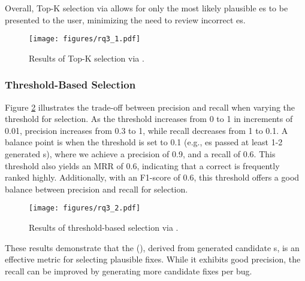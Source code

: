 Overall, Top-K selection via \enpassrate allows for only the most likely plausible \fixpatch{}es to be presented to the \autopr user, minimizing the need to review incorrect \fixpatch{}es.

\begin{figure}[t!]
    \centering
    \texttt{[image: figures/rq3\_1.pdf]}
    \caption{Results of Top-K \fixpatch selection via \enpassrate.}
    \label{fig:rq3_top_k}
\end{figure}

\subsubsection{Threshold-Based Selection}
Figure \ref{fig:rq3_threshold} illustrates the trade-off between precision and recall when varying the \enpassrate threshold for \fixpatch selection. 
As the \enpassrate threshold increases from 0 to 1 in increments of 0.01, precision increases from 0.3 to 1, while recall decreases from 1 to 0.1. 
A balance point is when the threshold is set to 0.1 (e.g., \fixpatch{}es passed at least 1-2 generated \brt{}s), where we achieve a precision of 0.9, and a recall of 0.6. This threshold also yields an MRR of 0.6, indicating that a correct \fixpatch is frequently ranked highly. 
Additionally, with an F1-score of 0.6, this threshold offers a good balance between precision and recall for \fixpatch selection.


\begin{figure}[t!]
    \centering
    \texttt{[image: figures/rq3\_2.pdf]}
    \caption{Results of threshold-based \fixpatch selection via \enpassrate.}
    \label{fig:rq3_threshold}
\end{figure}

These results demonstrate that the \enpassratefull (\enpassrate), derived from generated candidate \brt{}s, is an effective metric for selecting plausible fixes. 
While it exhibits good precision, the recall can be improved by generating more candidate fixes per bug.



